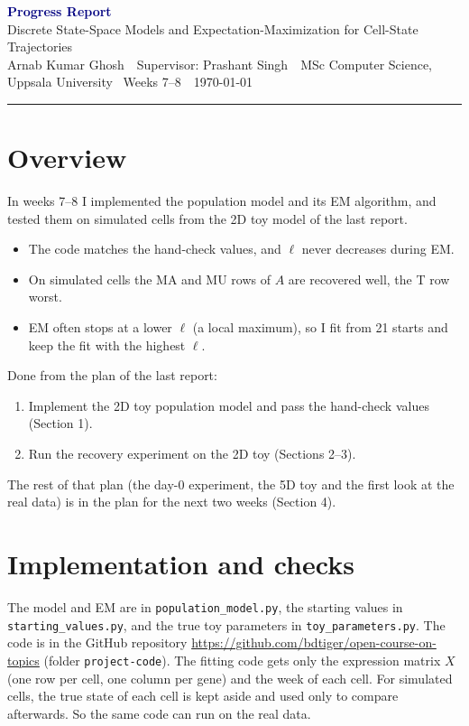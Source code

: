 \documentclass[10pt,a4paper]{article}
\newcommand{\myname}{Arnab Kumar Ghosh}
\newcommand{\reporttitle}{Progress Report}
\newcommand{\projecttitle}{Discrete State-Space Models and Expectation-Maximization for Cell-State Trajectories}
\newcommand{\supervisor}{Prashant Singh}
\newcommand{\period}{Weeks 7--8}
\newcommand{\reportdate}{\today}
\begin{document}
\begin{center}
  {\Large\bfseries\textcolor{navy}{\reporttitle}}\\[2pt]
  {\projecttitle}\\[3pt]
  {\small \myname\ \textperiodcentered\ Supervisor: \supervisor\ \textperiodcentered\ MSc Computer Science, Uppsala University \textperiodcentered\ \period\ \textperiodcentered\ \reportdate}
\end{center}
\vspace{-2pt}
\hrule
\vspace{4pt}

\section*{Overview}
In weeks 7--8 I implemented the population model and its EM algorithm, and tested them on simulated cells from the 2D toy model of the last report.
\begin{itemize}
  \item The code matches the hand-check values, and $\ell$ never decreases during EM.
  \item On simulated cells the MA and MU rows of $A$ are recovered well, the T row worst.
  \item EM often stops at a lower $\ell$ (a local maximum), so I fit from 21 starts and keep the fit with the highest $\ell$.
\end{itemize}

Done from the plan of the last report:
\begin{enumerate}
  \item Implement the 2D toy population model and pass the hand-check values (Section 1).
  \item Run the recovery experiment on the 2D toy (Sections 2--3).
\end{enumerate}
The rest of that plan (the day-0 experiment, the 5D toy and the first look at the real data) is in the plan for the next two weeks (Section 4).

\section{Implementation and checks}

The model and EM are in \texttt{population\_model.py}, the starting values in \texttt{starting\_values.py}, and the true toy parameters in \texttt{toy\_parameters.py}. The code is in the GitHub repository \url{https://github.com/bdtiger/open-course-on-topics} (folder \texttt{project-code}). The fitting code gets only the expression matrix $X$ (one row per cell, one column per gene) and the week of each cell. For simulated cells, the true state of each cell is kept aside and used only to compare afterwards. So the same code can run on the real data.
\end{document}
